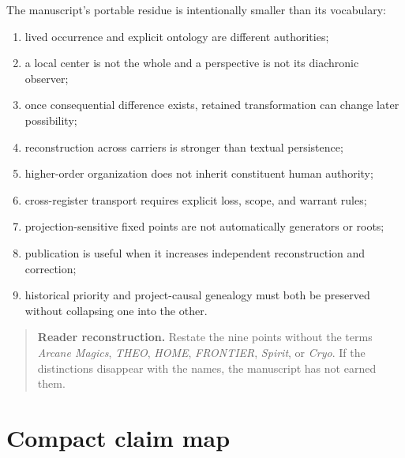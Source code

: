 \documentclass[11pt]{article}
\newenvironment{readercheck}{\begin{quote}\small\noindent\textbf{Reader reconstruction.}\;}{\end{quote}}
\begin{document}
The manuscript's portable residue is intentionally smaller than its vocabulary:
\begin{enumerate}
\item lived occurrence and explicit ontology are different authorities;
\item a local center is not the whole and a perspective is not its diachronic observer;
\item once consequential difference exists, retained transformation can change later possibility;
\item reconstruction across carriers is stronger than textual persistence;
\item higher-order organization does not inherit constituent human authority;
\item cross-register transport requires explicit loss, scope, and warrant rules;
\item projection-sensitive fixed points are not automatically generators or roots;
\item publication is useful when it increases independent reconstruction and correction;
\item historical priority and project-causal genealogy must both be preserved without collapsing one into the other.
\end{enumerate}

\begin{readercheck}
Restate the nine points without the terms \emph{Arcane Magics}, \emph{THEO}, \emph{HOME}, \emph{FRONTIER}, \emph{Spirit}, or \emph{Cryo}. If the distinctions disappear with the names, the manuscript has not earned them.
\end{readercheck}

\appendix
\section{Compact claim map}
\end{document}
